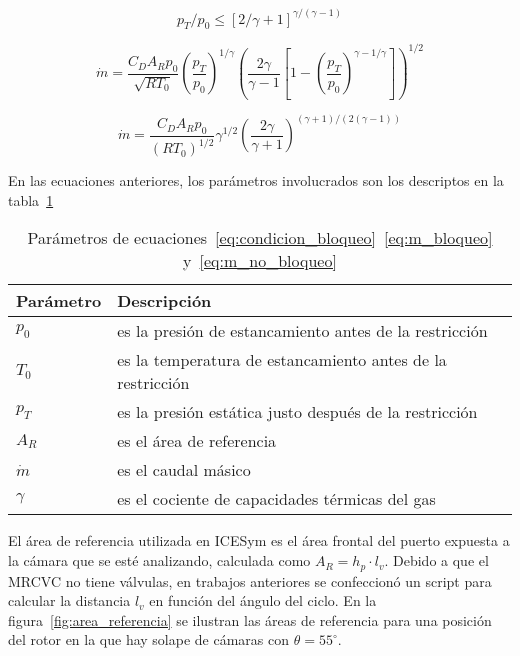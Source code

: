 \begin{equation}\label{eq:condicion_bloqueo}
  p_T/p_0 \le {[2/\gamma+1]}^{\gamma/(\gamma - 1)}
\end{equation}

\begin{equation}
    \label{eq:m_no_bloqueo}
    \dot{m} = \frac{C_D A_R p_0}{\sqrt{R T_0}}
            {\left(\frac{p_T}{p_0} \right)}^{1/\gamma}
            {\left( \frac{2\gamma}{\gamma-1} \left[1- {(\frac{p_T}{p_0})}^{{\gamma-1}/\gamma} \right] \right)}^{1/2}
\end{equation}

\begin{equation}\label{eq:m_bloqueo}
  \dot{m}=  \frac {C_D A_R p_0} {{(R T_0)}^{1/2}}
            \gamma^{1/2}
            {\left( \frac{2\gamma}{\gamma+1} \right)}^{(\gamma+1)/(2(\gamma-1))}
\end{equation}

En las ecuaciones anteriores, los parámetros involucrados son los descriptos en
la tabla~\ref{tab:parametros_cd}

\begin{table}
  \centering
  \begin{tabular}{ll}\toprule
    Parámetro & Descripción \\ \midrule
    $p_0$ & es la presión de estancamiento antes de la restricción \\
    $T_0$ & es la temperatura de estancamiento antes de la restricción \\
    $p_T$ & es la presión estática justo después de la restricción \\
    $A_R$ & es el área de referencia \\
    $\dot{m}$ & es el caudal másico \\
    $\gamma$ & es el cociente de capacidades térmicas del gas \\ \bottomrule
  \end{tabular}
  \caption{Parámetros de ecuaciones~\ref{eq:condicion_bloqueo}~\ref{eq:m_bloqueo} y~\ref{eq:m_no_bloqueo}}\label{tab:parametros_cd}
\end{table}

El área de referencia utilizada en ICESym es el área frontal del puerto expuesta
a la cámara que se esté analizando, calculada como $A_{R} = h_{p} \cdot l_{{v}}$.
%
Debido a que el MRCVC no tiene válvulas, en trabajos anteriores se confeccionó
un script para calcular la distancia $l_v$ en función del ángulo del ciclo.
%
En la figura~\ref{fig:area_referencia} se ilustran las áreas de referencia para
una posición del rotor en la que hay solape de cámaras con $\theta = 55^\circ$.

